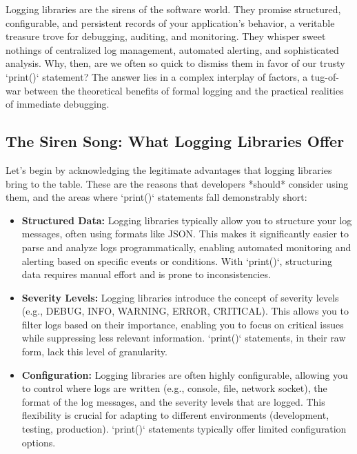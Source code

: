 \documentclass{article}
\begin{document}
{{{{Logging libraries are the sirens of the software world. They promise structured, configurable, and persistent records of your application's behavior, a veritable treasure trove for debugging, auditing, and monitoring. They whisper sweet nothings of centralized log management, automated alerting, and sophisticated analysis. Why, then, are we often so quick to dismiss them in favor of our trusty `print()` statement? The answer lies in a complex interplay of factors, a tug-of-war between the theoretical benefits of formal logging and the practical realities of immediate debugging.

\subsection*{The Siren Song: What Logging Libraries Offer}

Let's begin by acknowledging the legitimate advantages that logging libraries bring to the table. These are the reasons that developers *should* consider using them, and the areas where `print()` statements fall demonstrably short:

\begin{itemize}
    \item \textbf{Structured Data:} Logging libraries typically allow you to structure your log messages, often using formats like JSON. This makes it significantly easier to parse and analyze logs programmatically, enabling automated monitoring and alerting based on specific events or conditions. With `print()`, structuring data requires manual effort and is prone to inconsistencies.

    \item \textbf{Severity Levels:}  Logging libraries introduce the concept of severity levels (e.g., DEBUG, INFO, WARNING, ERROR, CRITICAL). This allows you to filter logs based on their importance, enabling you to focus on critical issues while suppressing less relevant information.  `print()` statements, in their raw form, lack this level of granularity.

    \item \textbf{Configuration:}  Logging libraries are often highly configurable, allowing you to control where logs are written (e.g., console, file, network socket), the format of the log messages, and the severity levels that are logged.  This flexibility is crucial for adapting to different environments (development, testing, production).  `print()` statements typically offer limited configuration options.


\end{itemize}}}}}
\end{document}
